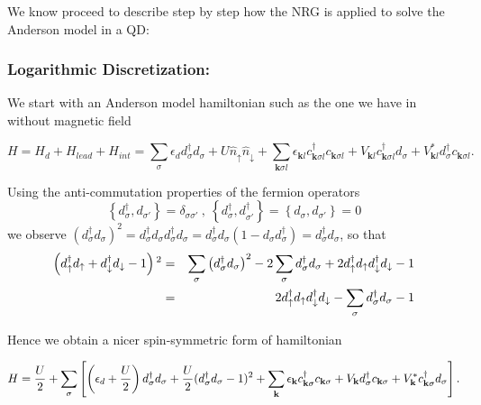 We know proceed to describe step by step how the NRG is applied to
solve the Anderson model in a QD:\\

\subsubsection{Logarithmic Discretization:}

We start with an Anderson model hamiltonian such as the one we have
in  without magnetic field

\begin{equation}
H=H_{d}+H_{lead}+H_{int}=\sum_{\sigma}\epsilon_{d}d_{\sigma}^{\dagger}d_{\sigma}+U\hat{n}_{\uparrow}\hat{n}_{\downarrow}+\sum_{\mathbf{k}\sigma l}\epsilon_{\mathbf{k}l}c_{\mathbf{k}\sigma l}^{\dagger}c_{\mathbf{k}\sigma l}+V_{\mathbf{k}l}c_{\mathbf{k}\sigma l}^{\dagger}d_{\sigma}+V_{\mathbf{k}l}^{*}d_{\sigma}^{\dagger}c_{\mathbf{k}\sigma l}.\label{eq:hamB0}
\end{equation}


Using the anti-commutation properties of the fermion operators 
\[
\left\{ d_{\sigma}^{\dagger},d_{\sigma'}\right\} =\delta_{\sigma\sigma'}\ ,\ \left\{ d_{\sigma}^{\dagger},d_{\sigma'}^{\dagger}\right\} =\left\{ d_{\sigma},d_{\sigma'}\right\} =0
\]
we observe $\left(d_{\sigma}^{\dagger}d_{\sigma}\right)^{2}=d_{\sigma}^{\dagger}d_{\sigma}d_{\sigma}^{\dagger}d_{\sigma}=d_{\sigma}^{\dagger}d_{\sigma}(1-d_{\sigma}d_{\sigma}^{\dagger})=d_{\sigma}^{\dagger}d_{\sigma}$,
so that 
\begin{eqnarray*}
\left(d_{\uparrow}^{\dagger}d_{\uparrow}+d_{\downarrow}^{\dagger}d_{\downarrow}-1\right){}^{2} & = & \sum_{\sigma}\left(d_{\sigma}^{\dagger}d_{\sigma}\right)^{2}-2\sum_{\sigma}d_{\sigma}^{\dagger}d_{\sigma}+2d_{\uparrow}^{\dagger}d_{\uparrow}d_{\downarrow}^{\dagger}d_{\downarrow}-1\\
 & = & 2d_{\uparrow}^{\dagger}d_{\uparrow}d_{\downarrow}^{\dagger}d_{\downarrow}-\sum_{\sigma}d_{\sigma}^{\dagger}d_{\sigma}-1
\end{eqnarray*}


Hence we obtain a nicer spin-symmetric form of hamiltonian  

\begin{equation}
H=\frac{U}{2}+\sum_{\sigma}\left[\left(\epsilon_{d}+\frac{U}{2}\right)d_{\sigma}^{\dagger}d_{\sigma}+\frac{U}{2}(d_{\sigma}^{\dagger}d_{\sigma}-1)^{2}+\sum_{\mathbf{k}}\epsilon_{\mathbf{k}}c_{\mathbf{k}\sigma}^{\dagger}c_{\mathbf{k}\sigma}+V_{\mathbf{k}}d_{\sigma}^{\dagger}c_{\mathbf{k}\sigma}+V_{\mathbf{k}}^{*}c_{\mathbf{k}\sigma}^{\dagger}d_{\sigma}\right].\label{HamWilson}
\end{equation}


